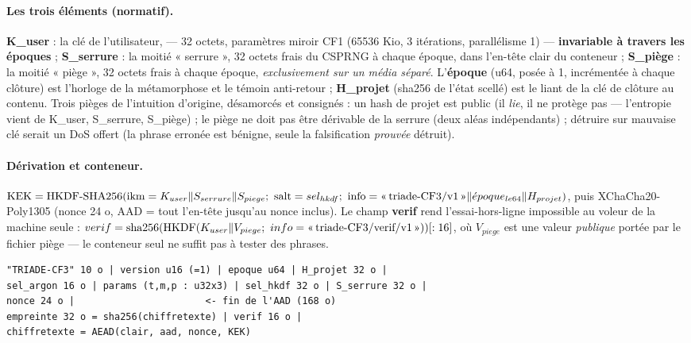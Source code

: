 \paragraph{Les trois éléments (normatif).} \textbf{K\_user} : la clé de l'utilisateur,
 — 32 octets, paramètres miroir CF1 (65536 Kio,
3 itérations, parallélisme 1) — \textbf{invariable à travers les époques} ;
\textbf{S\_serrure} : la moitié « serrure », 32 octets frais du CSPRNG à chaque époque,
dans l'en-tête clair du conteneur ; \textbf{S\_piège} : la moitié « piège », 32 octets
frais à chaque époque, \emph{exclusivement sur un média séparé}. L'\textbf{époque}
(u64, posée à 1, incrémentée à chaque clôture) est l'horloge de la métamorphose et le
témoin anti-retour ; \textbf{H\_projet} (sha256 de l'état scellé) est le liant de la clé
de clôture au contenu. Trois pièges de l'intuition d'origine, désamorcés et consignés :
un hash de projet est public (il \emph{lie}, il ne protège pas — l'entropie vient de
K\_user, S\_serrure, S\_piège) ; le piège ne doit pas être dérivable de la serrure
(deux aléas indépendants) ; détruire sur mauvaise clé serait un DoS offert (la phrase
erronée est bénigne, seule la falsification \emph{prouvée} détruit).

\paragraph{Dérivation et conteneur.}
$\mathrm{KEK} = \mathrm{HKDF\text{-}SHA256}(\mathrm{ikm} =
K_{user} \| S_{serrure} \| S_{piege};\ \mathrm{salt} = sel_{hkdf};\ \mathrm{info} =
\text{«\,triade-CF3/v1\,»} \| \acute{e}poque_{le64} \| H_{projet})$,
puis XChaCha20-Poly1305 (nonce 24 o, AAD = tout l'en-tête jusqu'au nonce inclus). Le
champ \textbf{verif} rend l'essai-hors-ligne impossible au voleur de la machine seule :
$verif = \mathrm{sha256}(\mathrm{HKDF}(K_{user} \| V_{piege};\ info =
\text{«\,triade-CF3/verif/v1\,»}))[:16]$, où $V_{piege}$ est une valeur
\emph{publique} portée par le fichier piège — le conteneur seul ne suffit pas à tester
des phrases.

\begin{lstlisting}
"TRIADE-CF3" 10 o | version u16 (=1) | epoque u64 | H_projet 32 o |
sel_argon 16 o | params (t,m,p : u32x3) | sel_hkdf 32 o | S_serrure 32 o |
nonce 24 o |                       <- fin de l'AAD (168 o)
empreinte 32 o = sha256(chiffretexte) | verif 16 o |
chiffretexte = AEAD(clair, aad, nonce, KEK)
\end{lstlisting}

